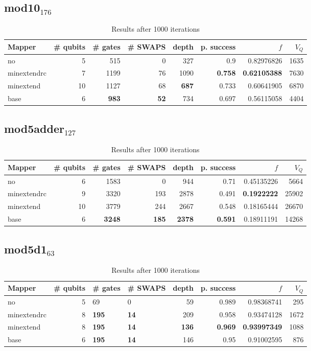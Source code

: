 \documentclass[11pt]{article}
\begin{document}
\subsection{mod10\(_{\text{176}}\)}
\label{sec:orgf8e2e05}
\begin{table}[H]
\caption{\label{tab:org67176fc}
Results after 1000 iterations}
\centering
\small
\begin{tabular}{lrrrrrrr}
\hline
Mapper & \# qubits & \# gates & \# SWAPS & depth & p. success & \(f\) & \(V_Q\)\\
\hline
no & 5 & 515 & 0 & 327 & 0.9 & 0.82976826 & 1635\\
\hline
minextendrc & 7 & 1199 & 76 & 1090 & \textbf{0.758} & \textbf{0.62105388} & 7630\\
minextend & 10 & 1127 & 68 & \textbf{687} & 0.733 & 0.60641905 & 6870\\
base & 6 & \textbf{983} & \textbf{52} & 734 & 0.697 & 0.56115058 & 4404\\
\hline
\end{tabular}
\end{table}
\subsection{mod5adder\(_{\text{127}}\)}
\label{sec:orgcd1201a}
\begin{table}[H]
\caption{\label{tab:org84809d0}
Results after 1000 iterations}
\centering
\small
\begin{tabular}{lrrrrrrr}
\hline
Mapper & \# qubits & \# gates & \# SWAPS & depth & p. success & \(f\) & \(V_Q\)\\
\hline
no & 6 & 1583 & 0 & 944 & 0.71 & 0.45135226 & 5664\\
\hline
minextendrc & 9 & 3320 & 193 & 2878 & 0.491 & \textbf{0.1922222} & 25902\\
minextend & 10 & 3779 & 244 & 2667 & 0.548 & 0.18165444 & 26670\\
base & 6 & \textbf{3248} & \textbf{185} & \textbf{2378} & \textbf{0.591} & 0.18911191 & 14268\\
\hline
\end{tabular}
\end{table}
\subsection{mod5d1\(_{\text{63}}\)}
\label{sec:org6da43a8}
\begin{table}[H]
\caption{\label{tab:org32ffe66}
Results after 1000 iterations}
\centering
\small
\begin{tabular}{lrllrrrr}
\hline
Mapper & \# qubits & \# gates & \# SWAPS & depth & p. success & \(f\) & \(V_Q\)\\
\hline
no & 5 & 69 & 0 & 59 & 0.989 & 0.98368741 & 295\\
\hline
minextendrc & 8 & \textbf{195} & \textbf{14} & 209 & 0.958 & 0.93474128 & 1672\\
minextend & 8 & \textbf{195} & \textbf{14} & \textbf{136} & \textbf{0.969} & \textbf{0.93997349} & 1088\\
base & 6 & \textbf{195} & \textbf{14} & 146 & 0.95 & 0.91002595 & 876\\
\hline
\end{tabular}
\end{table}
\end{document}
